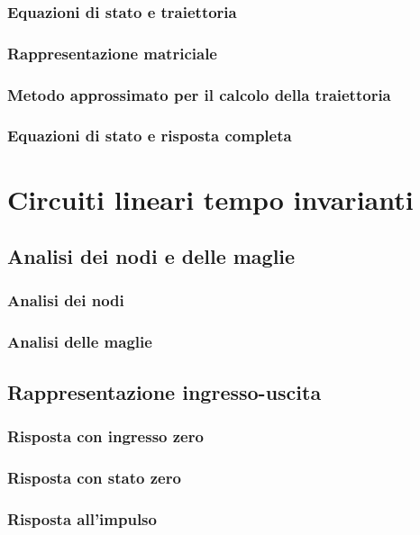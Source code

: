\documentclass[a4paper,12pt]{article}
\theoremstyle{mystyle}
\begin{document}
\subsubsection{Equazioni di stato e traiettoria}
\subsubsection{Rappresentazione matriciale}
\subsubsection{Metodo approssimato per il calcolo della traiettoria}
\subsubsection{Equazioni di stato e risposta completa}

\section{Circuiti lineari tempo invarianti}

\subsection{Analisi dei nodi e delle maglie}

\subsubsection{Analisi dei nodi}

\subsubsection{Analisi delle maglie}

\subsection{Rappresentazione ingresso-uscita}
\subsubsection{Risposta con ingresso zero}
\subsubsection{Risposta con stato zero}
\subsubsection{Risposta all'impulso}
\end{document}
